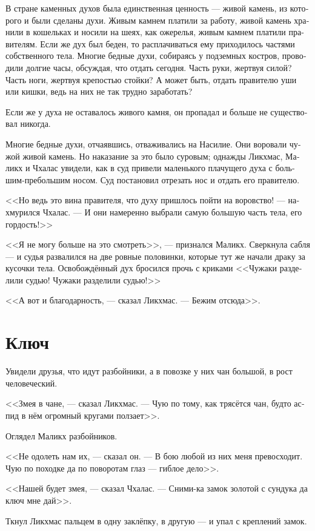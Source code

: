 \documentclass[a4paper,12pt,fleqn]{book}\usepackage{cooltooltips}\usepackage{polyglossia}\setdefaultlanguage[babelshorthands=true]{russian}\setotherlanguage{english}\defaultfontfeatures{Ligatures=TeX,Mapping=tex-text} \usepackage{xcolor}\definecolor{lightgray}{HTML}{bbbbbb}\color{lightgray}\newcommand{\ml}[3]{\textenglish{\textcolor{black}{#3}}}
\begin{document}
{В стране каменных духов была единственная ценность --- живой камень, из которого и были сделаны духи.
Живым камнем платили за работу, живой камень хранили в кошельках и носили на шеях, как ожерелья, живым камнем платили правителям.
Если же дух был беден, то расплачиваться ему приходилось частями собственного тела.
Многие бедные духи, собираясь у подземных костров, проводили долгие часы, обсуждая, что отдать сегодня.
Часть руки, жертвуя силой?
Часть ноги, жертвуя крепостью стойки?
А может быть, отдать правителю уши или кишки, ведь на них не так трудно заработать?

Если же у духа не оставалось живого камня, он пропадал и больше не существовал никогда.

Многие бедные духи, отчаявшись, отваживались на Насилие.
Они воровали чужой живой камень.
Но наказание за это было суровым;
однажды Ликхмас, Маликх и Чхалас увидели, как в суд привели маленького плачущего духа с большим-пребольшим носом.
Суд постановил отрезать нос и отдать его правителю.

<<Но ведь это вина правителя, что духу пришлось пойти на воровство! --- нахмурился Чхалас.
--- И они намеренно выбрали самую большую часть тела, его гордость!>>

<<Я не могу больше на это смотреть>>, --- признался Маликх.
Сверкнула сабля --- и судья развалился на две ровные половинки, которые тут же начали драку за кусочки тела.
Освобождённый дух бросился прочь с криками <<Чужаки разделили судью! Чужаки разделили судью!>>

<<А вот и благодарность, --- сказал Ликхмас.
--- Бежим отсюда>>.

\section{Ключ}

Увидели друзья, что идут разбойники, а в повозке у них чан большой, в рост человеческий.

<<Змея в чане, --- сказал Ликхмас.
--- Чую по тому, как трясётся чан, будто аспид в нём огромный кругами ползает>>.

Оглядел Маликх разбойников.

<<Не одолеть нам их, --- сказал он.
--- В бою любой из них меня превосходит.
Чую по походке да по поворотам глаз --- гиблое дело>>.

<<Нашей будет змея, --- сказал Чхалас.
--- Сними-ка замок золотой с сундука да ключ мне дай>>.

Ткнул Ликхмас пальцем в одну заклёпку, в другую --- и упал с креплений замок.

}
\end{document}
